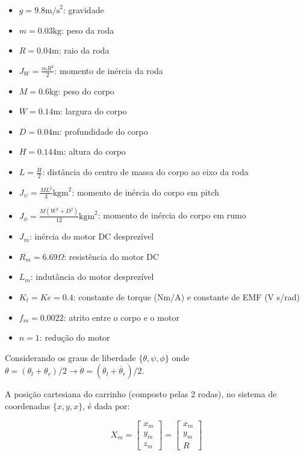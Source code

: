 \documentclass[10pt]{article}
\begin{document}
\begin{itemize}
    \item $g = 9.8 \text{m/s}^2$: gravidade
    \item $m = 0.03 \text{kg}$: peso da roda
    \item $R = 0.04 \text{m}$: raio da roda
    \item $J_W = \frac{m R^2}{2}$: momento de inércia da roda
    \item $M = 0.6 \text{kg}$: peso do corpo
    \item $W = 0.14 \text{m}$: largura do corpo
    \item $D = 0.04 \text{m}$: profundidade do corpo
    \item $H = 0.144 \text{m}$: altura do corpo
    \item $L = \frac{H}{2}$: distância do centro de massa do corpo ao eixo da roda
    \item $J_{\psi} = \frac{ML^2}{3} \text{kgm}^2$: momento de inércia do corpo em pitch
    \item $J_{\phi} = \frac{M(W^2 + D^2)}{12} \text{kgm}^2$: momento de inércia do corpo em rumo
    \item $J_m$: inércia do motor DC desprezível
    \item $R_m = 6.69 \Omega$: resistência do motor DC
    \item $L_m$: indutância do motor desprezível
    \item $K_t = Ke = 0.4$: constante de torque (Nm/A) e constante de EMF (V s/rad)
    \item $f_m = 0.0022$: atrito entre o corpo e o motor
    \item $n = 1$: redução do motor
\end{itemize}

\quad Considerando os graus de liberdade $\{\theta, \psi, \phi \}$ onde $\theta = (\theta_l + \theta_r)/2 \rightarrow \dot{\theta} = (\dot{\theta_l} + \dot{\theta_r})/2$.

\quad A posição cartesiana do carrinho (composto pelas 2 rodas), no sistema de coordenadas
$\{x, y, x\}$, é dada por:

\begin{equation}
    X_m =
    \begin{bmatrix}
        x_m \\
        y_m \\
        z_m
    \end{bmatrix} =
    \begin{bmatrix}
        x_m \\
        y_m \\
        R
    \end{bmatrix}
\end{equation}
\end{document}
